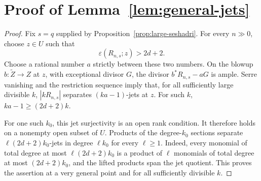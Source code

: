 \documentclass[12pt,a4paper,psamsfonts]{amsart}
\theoremstyle{definition}
\theoremstyle{plain}
\begin{document}
\section{Proof of Lemma~\ref{lem:general-jets}}
\begin{proof}
Fix $s=q$ supplied by Proposition~\ref{prop:large-seshadri}.
For every $n\gg0$, choose $z\in U$ such that
\[
 \varepsilon(R_{n,s};z)>2d+2.
\]
Choose a rational number $a$ strictly between these two numbers.
On the blowup $b:\widetilde Z\to Z$ at $z$, with exceptional
divisor $G$, the divisor $b^*R_{n,s}-aG$ is ample. Serre vanishing
and the restriction sequence imply that, for all sufficiently
large divisible $k$, $|kR_{n,s}|$ separates $(ka-1)$-jets at $z$.
For such $k$, $ka-1\ge(2d+2)k$.

For one such $k_0$, this jet surjectivity is an open rank condition.
It therefore holds on a nonempty open subset of $U$. Products of
the degree-$k_0$ sections separate $\ell(2d+2)k_0$-jets in degree
$\ell k_0$ for every $\ell\ge1$. Indeed, every monomial of total
degree at most $\ell(2d+2)k_0$ is a product of $\ell$ monomials
of total degree at most $(2d+2)k_0$, and the lifted products span
the jet quotient. This proves the assertion at a very general
point and for all sufficiently divisible $k$.
\end{proof}
\end{document}
